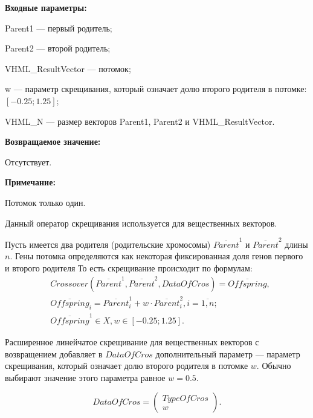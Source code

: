 \textbf{Входные параметры:}
 
Parent1 --- первый родитель;
 
Parent2 --- второй родитель;
 
VHML\_ResultVector --- потомок;

w --- параметр скрещивания, который означает долю второго родителя в потомке: $[-0.25;1.25]$;
 
VHML\_N --- размер векторов Parent1, Parent2 и VHML\_ResultVector.

\textbf{Возвращаемое значение:}

 Отсутствует.
 
\textbf{ Примечание:}

 Потомок только один.
 
Данный оператор скрещивания используется для вещественных векторов.

Пусть имеется два родителя (родительские хромосомы) $ \overline{Parent}^1 $ и $ \overline{Parent}^2$ длины $n$. Гены потомка определяются как некоторая фиксированная доля генов первого и второго родителя То есть скрещивание происходит по формулам:
\begin{align}
\label{SetOfOperatorsAlgorithms:eq:ExtendedLineForReal}
&Crossover \left( \overline{Parent}^1, \overline{Parent}^2, DataOfCros\right)=\overline{Offspring}, \\
& \overline{Offspring}_i=\overline{Parent}^1_i+w\cdot\overline{Parent}^2_i , i=\overline{1,n};\nonumber\\
&\overline{Offspring}^1\in X, w\in \left[ -0.25; 1.25\right] .\nonumber
\end{align}

Расширенное линейчатое скрещивание для вещественных векторов с возвращением добавляет в $ DataOfCros $ дополнительный параметр --- параметр скрещивания, который означает долю второго родителя в потомке $ w $. Обычно выбирают значение этого параметра равное $ w=0.5 $.

\begin{equation}
DataOfCros=\left( \begin{array}{c} TypeOfCros \\ w \end{array} \right).
\end{equation}